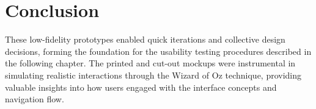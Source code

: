 \section{Conclusion}

These low-fidelity prototypes enabled quick iterations and collective design decisions, forming the foundation for the usability testing procedures described in the following chapter. The printed and cut-out mockups were instrumental in simulating realistic interactions through the Wizard of Oz technique, providing valuable insights into how users engaged with the interface concepts and navigation flow.